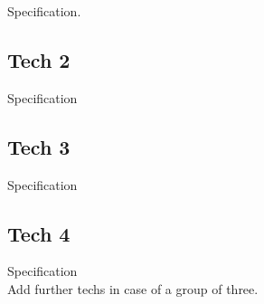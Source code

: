 \documentclass{article}
\begin{document}
Specification. 

\subsection{Tech 2}

Specification

\subsection{Tech 3}

Specification

\subsection{Tech 4}

Specification \\

Add further techs in case of a group of three.




\end{document}
